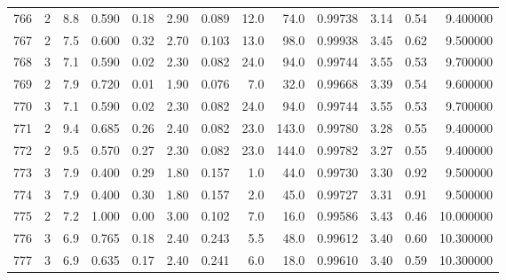 \begin{tabular}{lrrrrrrrrrrrr}
766  &        2 &            8.8 &             0.590 &         0.18 &            2.90 &      0.089 &                 12.0 &                  74.0 &  0.99738 &  3.14 &       0.54 &   9.400000 \\
767  &        2 &            7.5 &             0.600 &         0.32 &            2.70 &      0.103 &                 13.0 &                  98.0 &  0.99938 &  3.45 &       0.62 &   9.500000 \\
768  &        3 &            7.1 &             0.590 &         0.02 &            2.30 &      0.082 &                 24.0 &                  94.0 &  0.99744 &  3.55 &       0.53 &   9.700000 \\
769  &        2 &            7.9 &             0.720 &         0.01 &            1.90 &      0.076 &                  7.0 &                  32.0 &  0.99668 &  3.39 &       0.54 &   9.600000 \\
770  &        3 &            7.1 &             0.590 &         0.02 &            2.30 &      0.082 &                 24.0 &                  94.0 &  0.99744 &  3.55 &       0.53 &   9.700000 \\
771  &        2 &            9.4 &             0.685 &         0.26 &            2.40 &      0.082 &                 23.0 &                 143.0 &  0.99780 &  3.28 &       0.55 &   9.400000 \\
772  &        2 &            9.5 &             0.570 &         0.27 &            2.30 &      0.082 &                 23.0 &                 144.0 &  0.99782 &  3.27 &       0.55 &   9.400000 \\
773  &        3 &            7.9 &             0.400 &         0.29 &            1.80 &      0.157 &                  1.0 &                  44.0 &  0.99730 &  3.30 &       0.92 &   9.500000 \\
774  &        3 &            7.9 &             0.400 &         0.30 &            1.80 &      0.157 &                  2.0 &                  45.0 &  0.99727 &  3.31 &       0.91 &   9.500000 \\
775  &        2 &            7.2 &             1.000 &         0.00 &            3.00 &      0.102 &                  7.0 &                  16.0 &  0.99586 &  3.43 &       0.46 &  10.000000 \\
776  &        3 &            6.9 &             0.765 &         0.18 &            2.40 &      0.243 &                  5.5 &                  48.0 &  0.99612 &  3.40 &       0.60 &  10.300000 \\
777  &        3 &            6.9 &             0.635 &         0.17 &            2.40 &      0.241 &                  6.0 &                  18.0 &  0.99610 &  3.40 &       0.59 &  10.300000 \\

\end{tabular}
